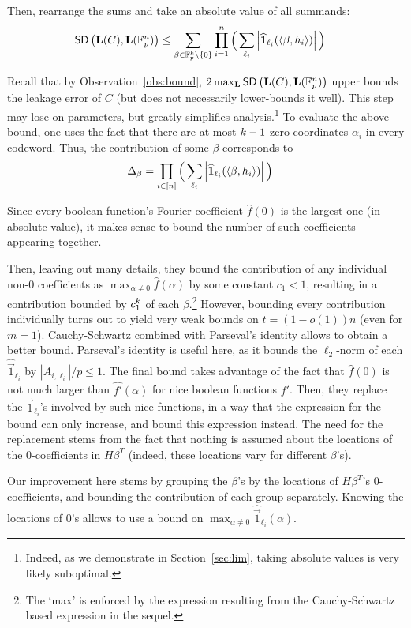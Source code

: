 Then, rearrange the sums and take an absolute value of all summands:
\begin{align}\label{eq:intro}
\mathsf{SD} \left({\mathbf{L}(C)},{\mathbf{L}(\mathbb{F}^n_p)} \right)&\leq \sum_{\beta\in 
\mathbb{F}^{k}_p\setminus{\{0\}}}\prod^n_{i=1}\Big(\sum_{\ell_i}\left|{\widehat{\mathbf{1}}}_{\ell_i}(\langle\beta,h_i\rangle)\right|\Big)\nonumber
\end{align}

Recall that by Observation~\ref{obs:bound}, $2\max_{\mathbf{L}}\mathsf{SD} \left({\mathbf{L}(C)},{\mathbf{L}(\mathbb{F}^n_p)} \right)$ upper bounds the leakage error of $C$ (but does not necessarily lower-bounds it well).
This step may lose on parameters, but greatly simplifies analysis.\footnote{Indeed, as we demonstrate in Section~\ref{sec:lim}, taking absolute values is very likely suboptimal.} 
To evaluate the above bound, one uses the fact that there are at most $k-1$ zero coordinates $\alpha_i$ in every codeword. Thus, the contribution of some $\beta$ corresponds to
\begin{align}
\Delta_\beta&=\prod_{i\in[n]}\Big(\sum_{\ell_i}\left|\widehat{\mathbf{1}}_{\ell_i}(\langle\beta,h_i\rangle)\right|\Big)
\end{align}


Since every boolean function's Fourier coefficient $\widehat{f}(0)$ is the largest one (in absolute value), it makes sense to bound the number of such coefficients appearing together.

Then, leaving out many details, they bound the contribution of any individual non-0 coefficients as $\max_{\alpha\neq 0}\widehat{f}(\alpha)$ by some constant $c_1<1$, resulting in a contribution bounded by $c^{k}_1$ of each $\beta$.\footnote{The `max' is enforced by the expression resulting from the Cauchy-Schwartz based expression in the sequel.}
However, bounding every contribution individually turns out to yield very weak bounds on $t=(1-o(1))n$ (even for $m=1$). Cauchy-Schwartz combined with Parseval's identity allows to obtain a better bound. 
Parseval's identity is useful here, as it bounds the $\ell_2$-norm of each $\widehat{\vec{1}}_{\ell_i}$ by $|A_{i,\ell_i}|/p\leq 1$. The final bound takes advantage of the fact that 
$\widehat{f}(0)$ is not much larger than $\widehat{f'}(\alpha)$ for nice boolean functions $f'$.
Then, they replace the $\vec{1}_{\ell_i}$'s involved by such nice functions, in a way that the expression for the bound can only increase, and bound this expression instead. The need for the replacement stems from the fact that nothing is assumed about the locations of the $0$-coefficients in $H\beta^T$ (indeed, these locations vary for different $\beta$'s).

Our improvement here stems by grouping the $\beta$'s by the locations of $H\beta^T$'s 0-coefficients, and bounding the contribution of each group separately. Knowing the locations of 0's allows to use a bound on $\max_{\alpha\neq 0} \widehat{\vec{1}}_{\ell_i}(\alpha)$. %
